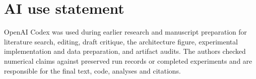 \documentclass{article}
\begin{document}
\section*{AI use statement}
OpenAI Codex was used during earlier research and manuscript preparation for literature search, editing, draft critique, the architecture figure, experimental implementation and data preparation, and artifact audits. The authors checked numerical claims against preserved run records or completed experiments and are responsible for the final text, code, analyses and citations.



\clearpage
\appendix
\renewcommand{\thesection}{A\arabic{section}}
\renewcommand{\theHsection}{appendix.\arabic{section}}
\renewcommand{\thefootnote}{\arabic{footnote}}

\end{document}
